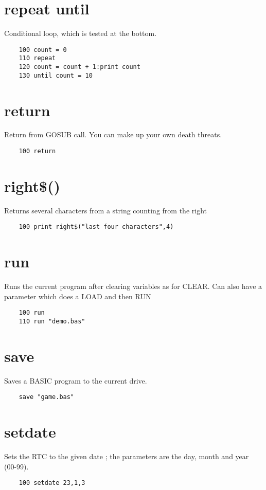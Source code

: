 \section*{repeat until}
Conditional loop, which is tested at the bottom.
\example{}
\begin{verbatim}
	100 count = 0
	110 repeat
	120 count = count + 1:print count
	130 until count = 10
\end{verbatim}

\section*{return}
Return from GOSUB call. You can make up your own death threats.
\example{}
\begin{verbatim}
	100 return
\end{verbatim}

\section*{right\$()}
Returns several characters from a string counting from the right
\example{}
\begin{verbatim}
	100 print right$("last four characters",4)
\end{verbatim}

\section*{run}
Runs the current program after clearing variables as for CLEAR. Can also have a parameter which does a LOAD and then RUN
\example{}
\begin{verbatim}
	100 run
	110 run "demo.bas"
\end{verbatim}

\section*{save}
Saves a BASIC program to the current drive.
\example{}
\begin{verbatim}
	save "game.bas"
\end{verbatim}

\section*{setdate}
Sets the RTC to the given date ; the parameters are the day, month and year (00-99). 
\example{}
\begin{verbatim}
	100 setdate 23,1,3
\end{verbatim}

